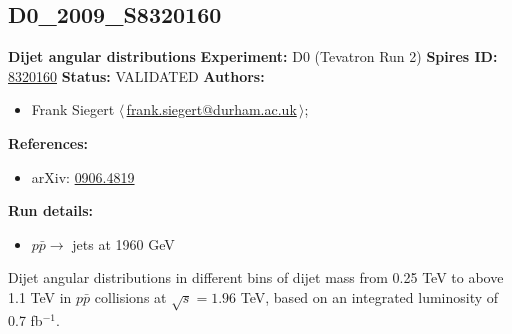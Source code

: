 \subsection[D0\_2009\_S8320160]{D0\_2009\_S8320160\,\cite{:2009mh}}
\textbf{Dijet angular distributions}\newline
\textbf{Experiment:} D0 (Tevatron Run 2) \newline
\textbf{Spires ID:} \href{http://www.slac.stanford.edu/spires/find/hep/www?rawcmd=key+8320160}{8320160}\newline
\textbf{Status:} VALIDATED\newline
\textbf{Authors:}
\begin{itemize}
  \item Frank Siegert $\langle\,$\href{mailto:frank.siegert@durham.ac.uk}{frank.siegert@durham.ac.uk}$\,\rangle$;
\end{itemize}
\textbf{References:}
\begin{itemize}
  \item arXiv: \href{http://arxiv.org/abs/0906.4819}{0906.4819}
\end{itemize}
\textbf{Run details:}
\begin{itemize}

  \item $p \bar{p} \to$ jets at 1960 GeV\end{itemize}

\noindent Dijet angular distributions in different bins of dijet mass from 0.25 TeV to above 1.1 TeV in $p \bar{p}$ collisions at $\sqrt{s} = 1.96$ TeV, based on an integrated luminosity of 0.7 fb$^{-1}$.

\clearpage


\clearpage

